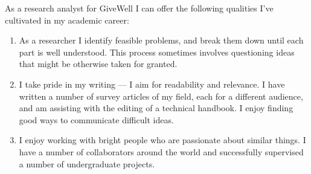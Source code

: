 \documentclass{letter}
\begin{document}
\begin{letter}{}
As a research analyst for GiveWell I can offer the following qualities I've cultivated in my academic career:
\begin{enumerate}
\item As a researcher I identify feasible problems, and break them down until each part is well understood. This process sometimes involves questioning ideas that might be otherwise taken for granted.
\item I take pride in my writing --- I aim for readability and relevance. I have written a number of survey articles of my field, each for a different audience, and am assisting with the editing of a technical handbook. I enjoy finding good ways to communicate difficult ideas.
\item I enjoy working with bright people who are passionate about similar things. I have a number of collaborators around the world and successfully supervised a number of undergraduate projects.
\end{enumerate}





\end{letter}
\end{document}
